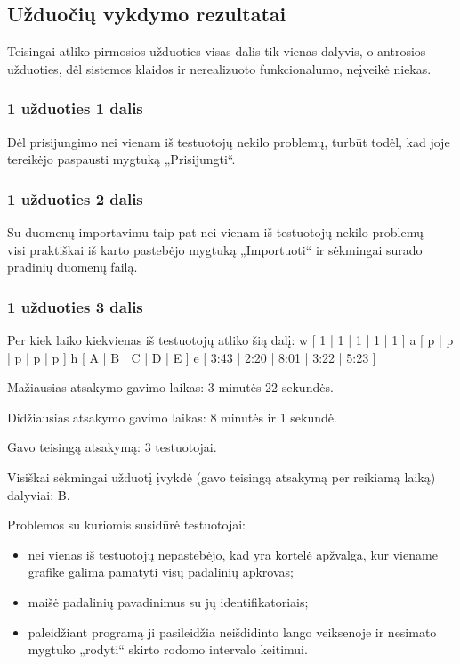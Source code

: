 \subsection{Užduočių vykdymo rezultatai}

Teisingai atliko pirmosios užduoties visas dalis tik vienas dalyvis,
o antrosios užduoties, dėl sistemos klaidos ir nerealizuoto
funkcionalumo, neįveikė niekas.

\subsubsection{1 užduoties 1 dalis}

Dėl prisijungimo nei vienam iš testuotojų nekilo problemų, turbūt todėl,
kad joje tereikėjo paspausti mygtuką „Prisijungti“.

\subsubsection{1 užduoties 2 dalis}

Su duomenų importavimu taip pat nei vienam iš testuotojų nekilo problemų
– visi praktiškai iš karto pastebėjo mygtuką „Importuoti“ ir sėkmingai
surado pradinių duomenų failą.

\subsubsection{1 užduoties 3 dalis}

Per kiek laiko kiekvienas iš testuotojų atliko šią dalį:
\xtable
{
  w [ 1 | 1 | 1 | 1 | 1 ]
  a [ p | p | p | p | p ]
  h [ A | B | C | D | E ]
  e [ 3:43 | 2:20 | 8:01 | 3:22 | 5:23 ]
}

Mažiausias atsakymo gavimo laikas: 3 minutės 22 sekundės.

Didžiausias atsakymo gavimo laikas: 8 minutės ir 1 sekundė.

Gavo teisingą atsakymą: 3 testuotojai.

Visiškai sėkmingai užduotį įvykdė (gavo teisingą atsakymą per reikiamą 
laiką) dalyviai: B.

Problemos su kuriomis susidūrė testuotojai:
\begin{itemize}
  \item nei vienas iš testuotojų nepastebėjo, kad yra kortelė apžvalga,
    kur viename grafike galima pamatyti visų padalinių apkrovas;
  \item maišė padalinių pavadinimus su jų identifikatoriais;
  \item paleidžiant programą ji pasileidžia neišdidinto lango veiksenoje
    ir nesimato mygtuko „rodyti“ skirto rodomo intervalo keitimui.
\end{itemize}

